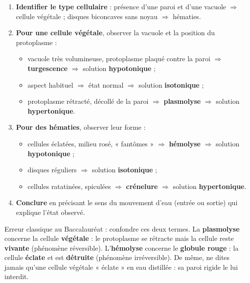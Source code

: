 \documentclass[11pt]{article}
\begin{document}
\begin{methode}
\begin{enumerate}
\item \textbf{Identifier le type cellulaire} : présence d'une paroi et d'une vacuole $\Rightarrow$ cellule végétale ; disques biconcaves sans noyau $\Rightarrow$ hématies.
\item \textbf{Pour une cellule végétale}, observer la vacuole et la position du protoplasme :
\begin{itemize}
\item vacuole très volumineuse, protoplasme plaqué contre la paroi $\Rightarrow$ \textbf{turgescence} $\Rightarrow$ solution \textbf{hypotonique} ;
\item aspect habituel $\Rightarrow$ état normal $\Rightarrow$ solution \textbf{isotonique} ;
\item protoplasme rétracté, décollé de la paroi $\Rightarrow$ \textbf{plasmolyse} $\Rightarrow$ solution \textbf{hypertonique}.
\end{itemize}
\item \textbf{Pour des hématies}, observer leur forme :
\begin{itemize}
\item cellules éclatées, milieu rosé, « fantômes » $\Rightarrow$ \textbf{hémolyse} $\Rightarrow$ solution \textbf{hypotonique} ;
\item disques réguliers $\Rightarrow$ solution \textbf{isotonique} ;
\item cellules ratatinées, spiculées $\Rightarrow$ \textbf{crénelure} $\Rightarrow$ solution \textbf{hypertonique}.
\end{itemize}
\item \textbf{Conclure} en précisant le sens du mouvement d'eau (entrée ou sortie) qui explique l'état observé.
\end{enumerate}
\end{methode}

\begin{attention}
Erreur classique au Baccalauréat : confondre ces deux termes. La \textbf{plasmolyse} concerne la cellule \textbf{végétale} : le protoplasme se rétracte mais la cellule reste \textbf{vivante} (phénomène réversible). L'\textbf{hémolyse} concerne le \textbf{globule rouge} : la cellule \textbf{éclate} et est \textbf{détruite} (phénomène irréversible). De même, ne dites jamais qu'une cellule végétale « éclate » en eau distillée : sa paroi rigide le lui interdit.
\end{attention}
\end{document}
